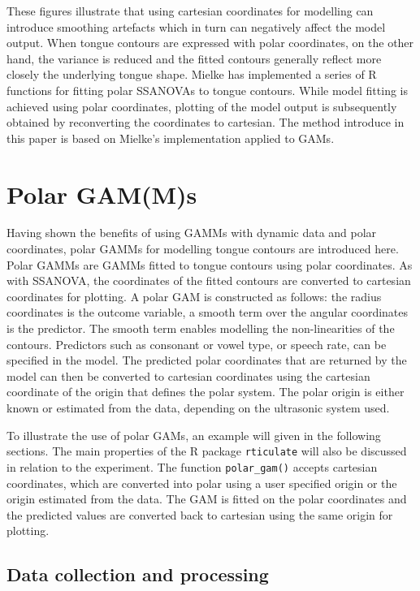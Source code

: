 \documentclass[12pt,]{article}
\begin{document}
These figures illustrate that using cartesian coordinates for modelling
can introduce smoothing artefacts which in turn can negatively affect
the model output. When tongue contours are expressed with polar
coordinates, on the other hand, the variance is reduced and the fitted
contours generally reflect more closely the underlying tongue shape.
Mielke has implemented a series of R \citep{r-core-team2018} functions
for fitting polar SSANOVAs to tongue contours. While model fitting is
achieved using polar coordinates, plotting of the model output is
subsequently obtained by reconverting the coordinates to cartesian. The
method introduce in this paper is based on Mielke's implementation
applied to GAMs.

\hypertarget{polar-gamms}{%
\section{Polar GAM(M)s}\label{polar-gamms}}

Having shown the benefits of using GAMMs with dynamic data and polar
coordinates, polar GAMMs for modelling tongue contours are introduced
here. Polar GAMMs are GAMMs fitted to tongue contours using polar
coordinates. As with SSANOVA, the coordinates of the fitted contours are
converted to cartesian coordinates for plotting. A polar GAM is
constructed as follows: the radius coordinates is the outcome variable,
a smooth term over the angular coordinates is the predictor. The smooth
term enables modelling the non-linearities of the contours. Predictors
such as consonant or vowel type, or speech rate, can be specified in the
model. The predicted polar coordinates that are returned by the model
can then be converted to cartesian coordinates using the cartesian
coordinate of the origin that defines the polar system. The polar origin
is either known or estimated from the data, depending on the ultrasonic
system used.

To illustrate the use of polar GAMs, an example will given in the
following sections. The main properties of the R package
\texttt{rticulate} will also be discussed in relation to the experiment.
The function \texttt{polar\_gam()} accepts cartesian coordinates, which
are converted into polar using a user specified origin or the origin
estimated from the data. The GAM is fitted on the polar coordinates and
the predicted values are converted back to cartesian using the same
origin for plotting.

\hypertarget{data-collection-and-processing}{%
\subsection{Data collection and
processing}\label{data-collection-and-processing}}
\end{document}
